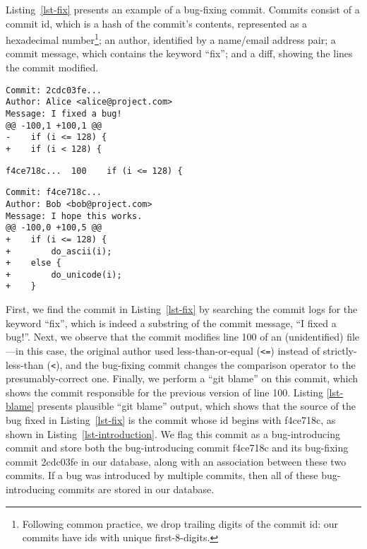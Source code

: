 Listing~\ref{lst-fix} presents an example of a bug-fixing commit. Commits
consist of a commit id, which is a hash of the commit's contents, represented as
a hexadecimal number\footnote{Following common practice, we drop trailing
 digits of the commit id: 
 our commits have ids with unique first-8-digits.}; an author, identified by a name/email address pair; a commit
message, which contains the keyword ``fix''; and a diff, showing the lines
the commit modified.


\begin{lstlisting}[caption=An example bug-fixing commit, label=lst-fix,
                  frame=single, captionpos=b, basicstyle=\small]
Commit: 2cdc03fe...
Author: Alice <alice@project.com>
Message: I fixed a bug!
@@ -100,1 +100,1 @@
-    if (i <= 128) {
+    if (i < 128) {
\end{lstlisting}

\begin{lstlisting}[caption={\tt git blame} output for the bug-fixing commit,
                   label=lst-blame, frame=single, captionpos=b, basicstyle=\small]
f4ce718c...  100    if (i <= 128) {
\end{lstlisting}

\begin{lstlisting}[caption=Associated bug-introducing commit for the example,
                   label=lst-introduction, frame=single, captionpos=b, basicstyle=\small]
Commit: f4ce718c...
Author: Bob <bob@project.com>
Message: I hope this works.
@@ -100,0 +100,5 @@
+    if (i <= 128) {
+        do_ascii(i);
+    else {
+        do_unicode(i);
+    }
\end{lstlisting}

First, we find the commit in Listing~\ref{lst-fix} by searching the commit
logs for the keyword ``fix'', which is indeed a substring of the commit message,
``I fixed a bug!''. Next, we observe that the commit modifies line 100 of
an (unidentified) file---in this case, the original author used
less-than-or-equal (\verb+<=+) instead of strictly-less-than (\verb+<+), and the
bug-fixing commit changes the comparison operator to the presumably-correct one.
Finally, we perform a ``git blame'' on this commit, which shows the commit
responsible for the previous version of line 100. Listing \ref{lst-blame}
presents plausible ``git blame'' output, which shows that the source of the bug
fixed in Listing~\ref{lst-fix} is the commit whose id begins with f4ce718c, as
shown in Listing~\ref{lst-introduction}. We flag this commit as a
bug-introducing commit and store both the bug-introducing commit f4ce718c and
its bug-fixing commit 2cdc03fe in our database, along with an association
between these two commits. If a bug was introduced by multiple commits, 
then all of these bug-introducing commits are stored in our database. 

